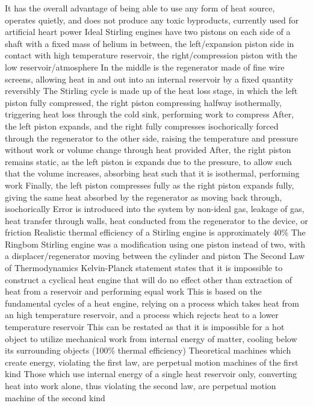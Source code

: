 \documentclass[11 pt, twoside]{article}
\newenvironment{outline*}
{
	\begin{outline}[enumerate]
	}
	{\end{outline}
}
\begin{document}
\begin{outline*}
\2 It has the overall advantage of being able to use any form of heat source, operates quietly, and does not produce any toxic byproducts, currently used for artificial heart power
\2 Ideal Stirling engines have two pistons on each side of a shaft with a fixed mass of helium in between, the left/expansion piston side in contact with high temperature reservoir, the right/compression piston with the low reservoir/atmosphere
\3 In the middle is the regenerator made of fine wire screens, allowing heat in and out into an internal reservoir by a fixed quantity reversibly
\2 The Stirling cycle is made up of the heat loss stage, in which the left piston fully compressed, the right piston compressing halfway isothermally, triggering heat loss through the cold sink, performing work to compress
\3 After, the left piston expands, and the right fully compresses isochorically forced through the regenerator to the other side, raising the temperature and pressure without work or volume change through heat provided
\3 After, the right piston remains static, as the left piston is expands due to the pressure, to allow such that the volume increases, absorbing heat such that it is isothermal, performing work
\3 Finally, the left piston compresses fully as the right piston expands fully, giving the same heat absorbed by the regenerator as moving back through, isochorically
\2 Error is introduced into the system by non-ideal gas, leakage of gas, heat transfer through walls, heat conducted from the regenerator to the device, or friction
\3 Realistic thermal efficiency of a Stirling engine is approximately 40\%
\2 The Ringbom Stirling engine was a modification using one piston instead of two, with a displacer/regenerator moving between the cylinder and piston
\1 The Second Law of Thermodynamics Kelvin-Planck statement states that it is impossible to construct a cyclical heat engine that will do no effect other than extraction of heat from a reservoir and performing equal work
\2 This is based on the fundamental cycles of a heat engine, relying on a process which takes heat from an high temperature reservoir, and a process which rejects heat to a lower temperature reservoir
\3 This can be restated as that it is impossible for a hot object to utilize mechanical work from internal energy of matter, cooling below its surrounding objects (100\% thermal efficiency)
\2 Theoretical machines which create energy, violating the first law, are perpetual motion machines of the first kind
\2 Those which use internal energy of a single heat reservoir only, converting heat into work alone, thus violating the second law, are perpetual motion machine of the second kind

\end{outline*}
\end{document}
